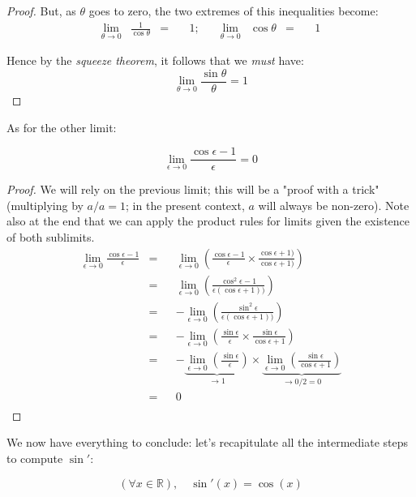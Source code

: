\documentclass[solutions.tex]{subfiles}
\begin{document}
\begin{proof}
But, as $\theta$ goes to zero, the two extremes of this inequalities become:
\begin{equation*} \begin{aligned}
	\lim_{\theta\rightarrow 0}&
		\frac{1}{\cos\theta} &=\quad& 1;\quad&
	\lim_{\theta\rightarrow 0}&
		\cos\theta &=\quad& 1
\end{aligned} \end{equation*}

Hence by the \textit{squeeze theorem}, it follows that we \textit{must} have:
\[
	\boxed{\lim_{\theta\rightarrow 0} \frac{\sin\theta}{\theta} = 1}
\]

\end{proof}

As for the other limit:
\begin{theorem}
\[
	\boxed{\lim_{\epsilon\rightarrow 0} \frac{\cos\epsilon-1}{\epsilon} = 0}
\]
\end{theorem}
\begin{proof} We will rely on the previous limit; this will be a "proof
with a trick" (multiplying by $a/a=1$; in the present context, $a$ will
always be non-zero). Note also at the end that we can
apply the product rules for limits given the existence of both sublimits.
\begin{equation*} \begin{aligned}
	\lim_{\epsilon\rightarrow 0} \frac{\cos\epsilon-1}{\epsilon}
		&=&& \lim_{\epsilon\rightarrow 0}\left(
			\frac{\cos\epsilon-1}{\epsilon}
			\times\frac{\cos\epsilon+1)}{\cos\epsilon+1)}
		\right) \\
	~ &=&& \lim_{\epsilon\rightarrow 0}\left(
			\frac{\cos^2\epsilon-1}{\epsilon(\cos\epsilon+1))}
		\right) \\
	~ &=&& -\lim_{\epsilon\rightarrow 0}\left(
			\frac{\sin^2\epsilon}{\epsilon(\cos\epsilon+1))}
		\right) \\
	~ &=&& -\lim_{\epsilon\rightarrow 0}\left(
			\frac{\sin\epsilon}{\epsilon}\times\frac{\sin\epsilon}{\cos\epsilon+1}
		\right) \\
	~ &=&& -\underbrace{\lim_{\epsilon\rightarrow 0}(
			\frac{\sin\epsilon}{\epsilon})}_{\rightarrow 1}
		\times\underbrace{
			\lim_{\epsilon\rightarrow 0}(\frac{\sin\epsilon}{\cos\epsilon+1})
		}_{\rightarrow 0/2=0} \\
	~ &=&& \boxed{0} \\
\end{aligned} \end{equation*}
\end{proof}
\hrr
We now have everything to conclude: let's recapitulate all the
intermediate steps to compute $\sin'$:
\begin{theorem}
\[
	(\forall x\in\mathbb{R}),\quad \boxed{\sin'(x) = \cos(x)}
\]
\end{theorem}
\end{document}

